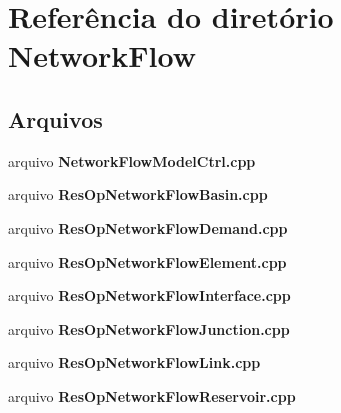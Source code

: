 \section{Referência do diretório Network\+Flow}
\label{dir_cafc834b3f050b71ef04a47c640366a7}
\subsection*{Arquivos}
\begin{DoxyCompactItemize}
\item 
arquivo {\bf Network\+Flow\+Model\+Ctrl.\+cpp}
\item 
arquivo {\bf Res\+Op\+Network\+Flow\+Basin.\+cpp}
\item 
arquivo {\bf Res\+Op\+Network\+Flow\+Demand.\+cpp}
\item 
arquivo {\bf Res\+Op\+Network\+Flow\+Element.\+cpp}
\item 
arquivo {\bf Res\+Op\+Network\+Flow\+Interface.\+cpp}
\item 
arquivo {\bf Res\+Op\+Network\+Flow\+Junction.\+cpp}
\item 
arquivo {\bf Res\+Op\+Network\+Flow\+Link.\+cpp}
\item 
arquivo {\bf Res\+Op\+Network\+Flow\+Reservoir.\+cpp}
\end{DoxyCompactItemize}
